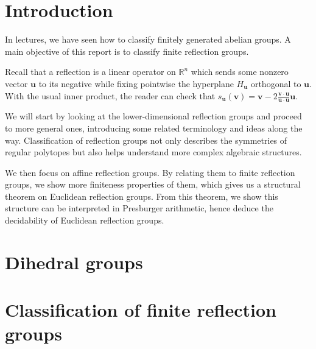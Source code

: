 \documentclass[a4paper,11pt, titlepage]{article}
\begin{document}
\begin{titlepage}

\end{titlepage}

\begin{abstract}

\end{abstract}

\tableofcontents
\clearpage

\section{Introduction}
In lectures, we have seen how to classify finitely generated abelian groups. A main objective of this report is to classify finite reflection groups.

Recall that a reflection is a linear operator on $\mathbb{R}^n$ which sends some nonzero vector $\mathbf{u}$ to its negative while fixing pointwise the hyperplane $H_{\mathbf{u}}$ orthogonal to $\mathbf{u}$. With the usual inner product, the reader can check that $s_{\mathbf{u}}(\mathbf{v}) = \mathbf{v} - 2\frac{\mathbf{v} \cdot \mathbf{u}}{\mathbf{u} \cdot \mathbf{u}}\mathbf{u}$.

We will start by looking at the lower-dimensional reflection groups and proceed to more general ones, introducing some related terminology and ideas along the way.
Classification of reflection groups not only describes the symmetries of regular polytopes but also helps understand more complex algebraic structures. 




We then focus on affine reflection groups. By relating them to finite reflection groups, we show more finiteness properties of them, which gives us a structural theorem on Euclidean reflection groups. From this theorem, we show this structure can be interpreted in Presburger arithmetic, hence deduce the decidability of Euclidean reflection groups. 

\section{Dihedral groups}


\section{Classification of finite reflection groups}\label{Classification}

\end{document}
